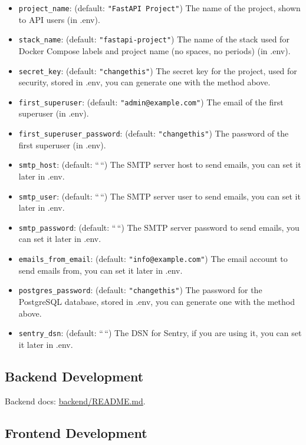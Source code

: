 \begin{itemize}
\tightlist
\item
  \texttt{project\_name}: (default: \texttt{"FastAPI\ Project"}) The
  name of the project, shown to API users (in .env).
\item
  \texttt{stack\_name}: (default: \texttt{"fastapi-project"}) The name
  of the stack used for Docker Compose labels and project name (no
  spaces, no periods) (in .env).
\item
  \texttt{secret\_key}: (default: \texttt{"changethis"}) The secret key
  for the project, used for security, stored in .env, you can generate
  one with the method above.
\item
  \texttt{first\_superuser}: (default: \texttt{"admin@example.com"}) The
  email of the first superuser (in .env).
\item
  \texttt{first\_superuser\_password}: (default: \texttt{"changethis"})
  The password of the first superuser (in .env).
\item
  \texttt{smtp\_host}: (default: ``\,``) The SMTP server host to send
  emails, you can set it later in .env.
\item
  \texttt{smtp\_user}: (default: ``\,``) The SMTP server user to send
  emails, you can set it later in .env.
\item
  \texttt{smtp\_password}: (default: ``\,``) The SMTP server password to
  send emails, you can set it later in .env.
\item
  \texttt{emails\_from\_email}: (default: \texttt{"info@example.com"})
  The email account to send emails from, you can set it later in .env.
\item
  \texttt{postgres\_password}: (default: \texttt{"changethis"}) The
  password for the PostgreSQL database, stored in .env, you can generate
  one with the method above.
\item
  \texttt{sentry\_dsn}: (default: ``\,``) The DSN for Sentry, if you are
  using it, you can set it later in .env.
\end{itemize}

\hypertarget{backend-development}{%
\subsection{Backend Development}\label{backend-development}}

Backend docs: \href{./backend/README.md}{backend/README.md}.

\hypertarget{frontend-development}{%
\subsection{Frontend Development}\label{frontend-development}}

